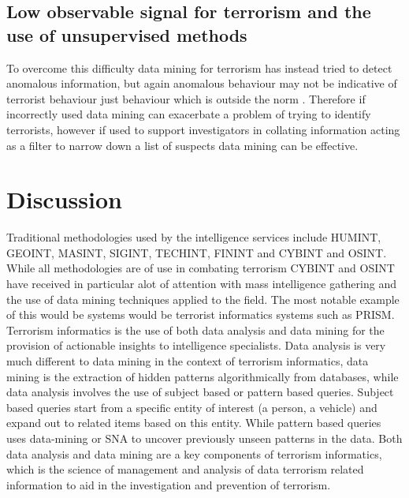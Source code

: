 \subsection{Low observable signal for terrorism and the use of unsupervised methods}

To overcome this difficulty data mining for terrorism has instead tried to detect anomalous information, but again anomalous behaviour may not be indicative of terrorist behaviour just behaviour which is outside the norm \citep{thuraisingham2004data}. Therefore if incorrectly used data mining can exacerbate a problem of trying to identify terrorists, however if used to support investigators in collating information acting as a filter to narrow down a list of suspects data mining can be effective.

\section{Discussion}
Traditional methodologies used by the intelligence services include  HUMINT, GEOINT, MASINT, SIGINT, TECHINT, FININT and CYBINT and OSINT. While all methodologies are of use in combating terrorism CYBINT and OSINT have received in particular alot of attention with mass intelligence gathering and the use of data mining techniques applied to the field. The most notable example of this would be systems would be terrorist informatics systems such as PRISM. Terrorism informatics is the use of both data analysis and data mining for the provision of actionable insights to intelligence specialists. Data analysis is very much different to data mining in the context of terrorism informatics, data mining is the extraction of hidden patterns algorithmically from databases, while data analysis involves the use of subject based or pattern based queries. Subject based queries start from a specific entity of interest (a person, a vehicle) and expand out to related items based on this entity. While pattern based queries uses data-mining or SNA to uncover previously unseen patterns in the data. Both data analysis and data mining are a key components of terrorism informatics,  which is the science of management and analysis of data terrorism related information to aid in the investigation and prevention of terrorism.


